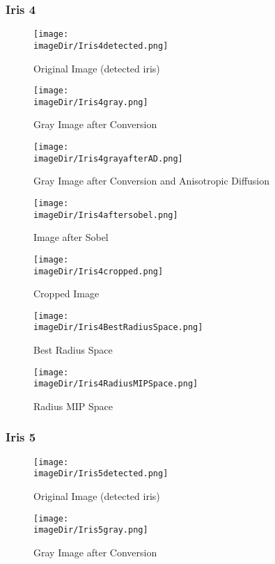 \documentclass[11pt, a4paper, twoside]{article}   	%
\newcommand{\imageDir}{images}
\begin{document}
\subsubsection{Iris 4}
\begin{figure}[H]
	\centering
	\texttt{[image: \\imageDir/Iris4detected.png]}
	\caption{Original Image (detected iris)}
\end{figure}

\begin{figure}[H]
	\centering
	\texttt{[image: \\imageDir/Iris4gray.png]}
	\caption{Gray Image after Conversion}
\end{figure}

\begin{figure}[H]
	\centering
	\texttt{[image: \\imageDir/Iris4grayafterAD.png]}
	\caption{Gray Image after Conversion and Anisotropic Diffusion}
\end{figure}

\begin{figure}[H]
	\centering
	\texttt{[image: \\imageDir/Iris4aftersobel.png]}
	\caption{Image after Sobel}
\end{figure}

\begin{figure}[H]
	\centering
	\texttt{[image: \\imageDir/Iris4cropped.png]}
	\caption{Cropped Image}
\end{figure}

\begin{figure}[H]
	\centering
	\texttt{[image: \\imageDir/Iris4BestRadiusSpace.png]}
	\caption{Best Radius Space}
\end{figure}

\begin{figure}[H]
	\centering
	\texttt{[image: \\imageDir/Iris4RadiusMIPSpace.png]}
	\caption{Radius MIP Space}
\end{figure}

\newpage
\subsubsection{Iris 5}
\begin{figure}[H]
	\centering
	\texttt{[image: \\imageDir/Iris5detected.png]}
	\caption{Original Image (detected iris)}
\end{figure}

\begin{figure}[H]
	\centering
	\texttt{[image: \\imageDir/Iris5gray.png]}
	\caption{Gray Image after Conversion}
\end{figure}
\end{document}
